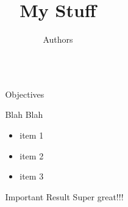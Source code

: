 \documentclass[final]{beamer}
\title{My Stuff} %
\author{Authors} %
\institute{Wentworth Institute of Technology, Department of Applied Mathematics} %
\newlength{\sepwid}
\newlength{\onecolwid}
\begin{document}

\setlength{\belowcaptionskip}{2ex} %
\setlength\belowdisplayshortskip{2ex} %

\begin{frame}[t] %

\begin{columns}[t] %

\begin{column}{\sepwid}\end{column} %

\begin{column}{\onecolwid} %


\begin{alertblock}{Objectives}
{\small
Blah Blah
\begin{itemize}
\item item 1
\item item 2
\item item 3
\end{itemize}
}
\end{alertblock}


\begin{alertblock}{Important Result}
{\small
Super great!!!
}
\end{alertblock} 



\end{column}
\end{columns}
\end{frame}
\end{document}
